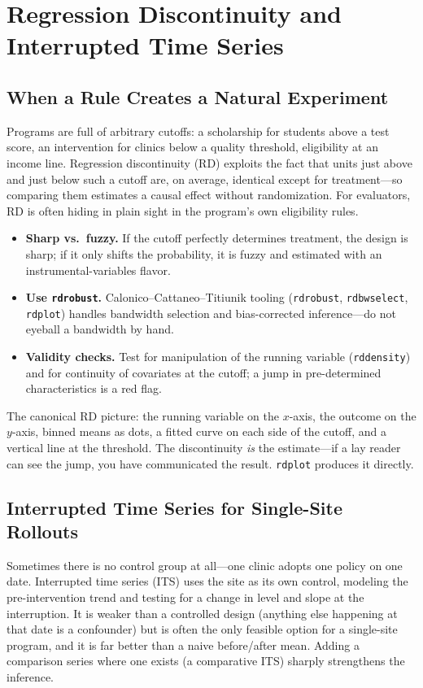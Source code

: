 \documentclass[
    a4paper,
    fontsize=10pt,
    twoside=true,
    numbers=noenddot,
]{kaobook}
\newenvironment{vizcallout}[1][Visualization to build]{%
    \begin{vizbox}[frametitle={#1}]%
}{%
    \end{vizbox}%
}
\begin{document}
\chapter{Regression Discontinuity and Interrupted Time Series}
\section{When a Rule Creates a Natural Experiment}
Programs are full of arbitrary cutoffs: a scholarship for students above a test score, an intervention for clinics below a quality threshold, eligibility at an income line. Regression discontinuity (RD) exploits the fact that units just above and just below such a cutoff are, on average, identical except for treatment---so comparing them estimates a causal effect without randomization. For evaluators, RD is often hiding in plain sight in the program's own eligibility rules.
\begin{itemize}
    \item \textbf{Sharp vs.\ fuzzy.} If the cutoff perfectly determines treatment, the design is sharp; if it only shifts the probability, it is fuzzy and estimated with an instrumental-variables flavor.
    \item \textbf{Use \texttt{rdrobust}.} Calonico--Cattaneo--Titiunik tooling (\texttt{rdrobust}, \texttt{rdbwselect}, \texttt{rdplot}) handles bandwidth selection and bias-corrected inference---do not eyeball a bandwidth by hand.
    \item \textbf{Validity checks.} Test for manipulation of the running variable (\texttt{rddensity}) and for continuity of covariates at the cutoff; a jump in pre-determined characteristics is a red flag.
\end{itemize}

\begin{vizcallout}[Visualization to build: the RD plot]
The canonical RD picture: the running variable on the $x$-axis, the outcome on the $y$-axis, binned means as dots, a fitted curve on each side of the cutoff, and a vertical line at the threshold. The discontinuity \emph{is} the estimate---if a lay reader can see the jump, you have communicated the result. \texttt{rdplot} produces it directly.
\end{vizcallout}

\section{Interrupted Time Series for Single-Site Rollouts}
Sometimes there is no control group at all---one clinic adopts one policy on one date. Interrupted time series (ITS) uses the site as its own control, modeling the pre-intervention trend and testing for a change in level and slope at the interruption. It is weaker than a controlled design (anything else happening at that date is a confounder) but is often the only feasible option for a single-site program, and it is far better than a naive before/after mean. Adding a comparison series where one exists (a comparative ITS) sharply strengthens the inference.
\end{document}

